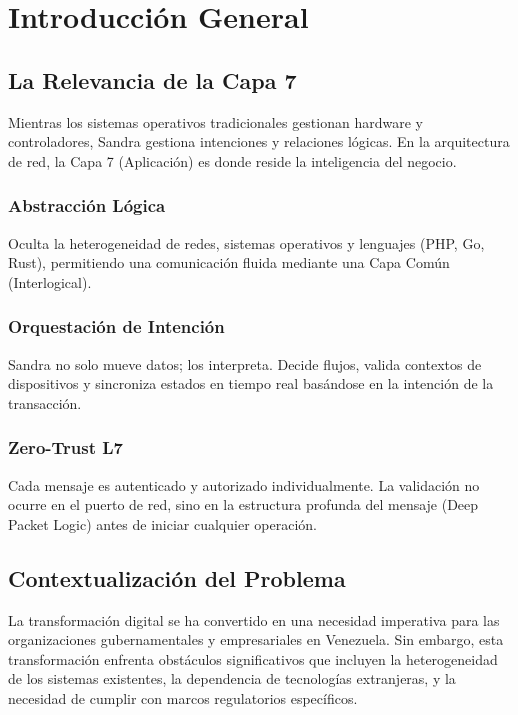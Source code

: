 \chapter{Introducci\'on General}

\section{La Relevancia de la Capa 7}

Mientras los sistemas operativos tradicionales gestionan hardware y controladores, Sandra gestiona intenciones y relaciones lógicas. En la arquitectura de red, la Capa 7 (Aplicación) es donde reside la inteligencia del negocio.

\subsection{Abstracci\'on L\'ogica}
Oculta la heterogeneidad de redes, sistemas operativos y lenguajes (PHP, Go, Rust), permitiendo una comunicación fluida mediante una Capa Común (Interlogical).

\subsection{Orquestaci\'on de Intenci\'on}
Sandra no solo mueve datos; los interpreta. Decide flujos, valida contextos de dispositivos y sincroniza estados en tiempo real basándose en la intención de la transacción.

\subsection{Zero-Trust L7}
Cada mensaje es autenticado y autorizado individualmente. La validación no ocurre en el puerto de red, sino en la estructura profunda del mensaje (Deep Packet Logic) antes de iniciar cualquier operación.

\section{Contextualizaci\'on del Problema}

La transformaci\'on digital se ha convertido en una necesidad imperativa para las organizaciones gubernamentales y empresariales en Venezuela. Sin embargo, esta transformaci\'on enfrenta obst\'aculos significativos que incluyen la heterogeneidad de los sistemas existentes, la dependencia de tecnolog\'ias extranjeras, y la necesidad de cumplir con marcos regulatorios espec\'ificos.

